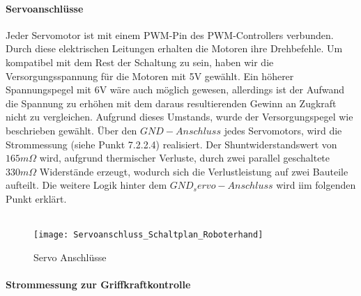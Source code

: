 \documentclass[titlepage,12pt,twoside]{article}
\begin{document}
\paragraph{Servoanschlüsse}
\hfill \break
\hfill \break
Jeder Servomotor ist mit einem PWM-Pin des PWM-Controllers verbunden. Durch diese elektrischen Leitungen erhalten die Motoren ihre Drehbefehle. Um kompatibel mit dem Rest der Schaltung zu sein, haben wir die Versorgungsspannung für die Motoren mit
5V gewählt. Ein höherer Spannungspegel mit 6V wäre auch möglich gewesen, allerdings ist der Aufwand die Spannung zu erhöhen mit dem daraus resultierenden Gewinn an Zugkraft nicht zu vergleichen. Aufgrund dieses Umstands, wurde der Versorgungspegel
wie beschrieben gewählt. Über den $GND-Anschluss$ jedes Servomotors, wird die Strommessung (siehe Punkt 7.2.2.4) realisiert. Der Shuntwiderstandswert von $165m\Omega$ wird, aufgrund thermischer Verluste, durch zwei parallel geschaltete $330m\Omega$ 
Widerstände erzeugt, wodurch sich die Verlustleistung auf zwei Bauteile aufteilt. Die weitere Logik hinter dem $GND_servo-Anschluss$ wird iim folgenden Punkt erklärt. \\
\\
\begin{figure}[H]
	\begin{center}
		\scalebox{1.0}
		{\texttt{[image: Servoanschluss\_Schaltplan\_Roboterhand]}}
		\caption{Servo Anschlüsse}
		\label{fig:Servoanschluss_Schaltplan_Roboterhand}		
	\end{center}
\end{figure}
\hfill \break

\paragraph{Strommessung zur Griffkraftkontrolle}
\hfill \break
\hfill \break
\end{document}
